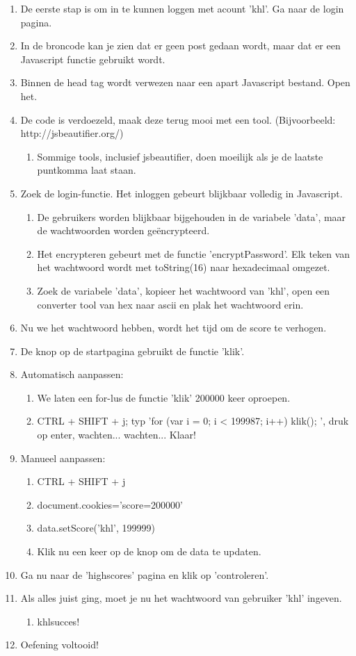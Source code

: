 \begin{enumerate}
  \item De eerste stap is om in te kunnen loggen met acount 'khl'. Ga naar de login pagina.
  \item In de broncode kan je zien dat er geen post gedaan wordt, maar dat er een Javascript functie gebruikt wordt.
  \item Binnen de head tag wordt verwezen naar een apart Javascript bestand. Open het.
  \item De code is verdoezeld, maak deze terug mooi met een tool. (Bijvoorbeeld: http://jsbeautifier.org/)
   \begin{enumerate}
   \item Sommige tools, inclusief jsbeautifier, doen moeilijk als je de laatste puntkomma laat staan.
   \end{enumerate}
  \item Zoek de login-functie. Het inloggen gebeurt blijkbaar volledig in Javascript.
   \begin{enumerate}
   \item De gebruikers worden blijkbaar bijgehouden in de variabele 'data', maar de wachtwoorden worden geëncrypteerd.
   \item Het encrypteren gebeurt met de functie 'encryptPassword'. Elk teken van het wachtwoord wordt met toString(16) naar hexadecimaal omgezet.
\item Zoek de variabele 'data', kopieer het wachtwoord van 'khl', open een converter tool van hex naar ascii en plak het wachtwoord erin.
   \end{enumerate}
  \item Nu we het wachtwoord hebben, wordt het tijd om de score te verhogen.
  \item De knop op de startpagina gebruikt de functie 'klik'.
  \item Automatisch aanpassen:
  \begin{enumerate}
  \item We laten een for-lus de functie 'klik' 200000 keer oproepen.
  \item CTRL + SHIFT + j; typ 'for (var i = 0; i < 199987; i++) { klik(); }', druk op enter, wachten... wachten... Klaar!
   \end{enumerate}
  \item Manueel aanpassen:
   \begin{enumerate}
   \item CTRL + SHIFT + j
   \item document.cookies='score=200000'
   \item data.setScore('khl', 199999)
   \item Klik nu een keer op de knop om de data te updaten.
   \end{enumerate}
  \item Ga nu naar de 'highscores' pagina en klik op 'controleren'.
  \item Als alles juist ging, moet je nu het wachtwoord van gebruiker 'khl' ingeven.
     \begin{enumerate}
  \item khlsucces!
  \end{enumerate}
  \item Oefening voltooid!
\end{enumerate}